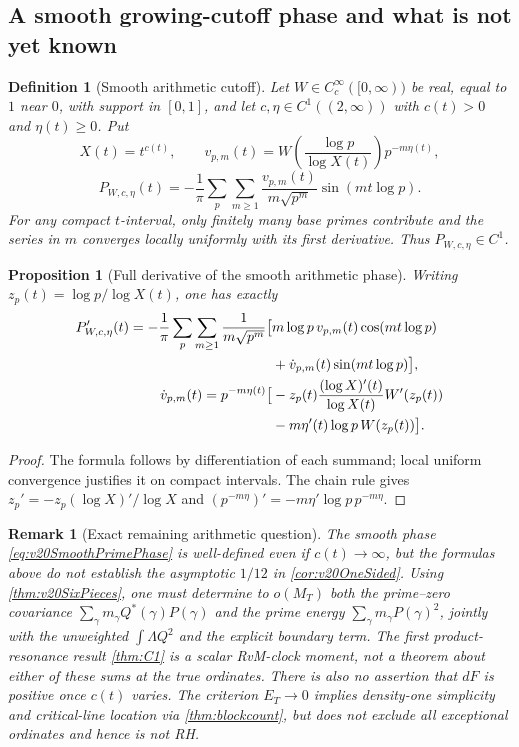 \documentclass[11pt,reqno]{amsart}
\numberwithin{equation}{section}
\newtheorem{proposition}[theorem]{Proposition}
\newtheorem{definition}[theorem]{Definition}
\newtheorem{remark}[theorem]{Remark}
\begin{document}
\subsection{A smooth growing-cutoff phase and what is not yet known}
\label{subsec:v20GrowingCutoff}
\begin{definition}[Smooth arithmetic cutoff]
Let $W\in C_c^\infty([0,\infty))$ be real, equal to $1$ near
$0$, with support in $[0,1]$, and let $c,\eta\in C^1((2,\infty))$
with $c(t)>0$ and $\eta(t)\ge0$.  Put
\[X(t)=t^{c(t)},\qquad
v_{p,m}(t)=W\left(\frac{\log p}{\log X(t)}\right)
                  p^{-m\eta(t)},\]
\begin{equation}\label{eq:v20SmoothPrimePhase}
P_{W,c,\eta}(t)=-\frac1\pi\sum_{p}\sum_{m\ge1}
\frac{v_{p,m}(t)}{m\sqrt{p^m}}\sin(mt\log p).
\end{equation}
For any compact $t$-interval, only finitely many base primes
contribute and the series in $m$ converges locally uniformly with
its first derivative.  Thus $P_{W,c,\eta}\in C^1$.
\end{definition}
\begin{proposition}[Full derivative of the smooth arithmetic phase]
\label{prop:v20SmoothDerivative}
Writing $z_p(t)=\log p/\log X(t)$, one has exactly
\begin{align}\label{eq:v20SmoothDerivative}
P_{W,c,\eta}'(t)=-\frac1\pi\sum_p\sum_{m\ge1}
\frac1{m\sqrt{p^m}}\bigl[&m\log p\,v_{p,m}(t)\cos(mt\log p)\notag\\
&+\dot v_{p,m}(t)\sin(mt\log p)\bigr],\\
\dot v_{p,m}(t)=p^{-m\eta(t)}\bigl[
&-z_p(t)\frac{(\log X)'(t)}{\log X(t)}W'(z_p(t))\notag\\
&-m\eta'(t)\log p\,W(z_p(t))\bigr].\notag
\end{align}
\end{proposition}
\begin{proof}
The formula follows by differentiation of each summand;
local uniform convergence justifies it on compact intervals.
The chain rule gives
$z_p'=-z_p(\log X)'/\log X$ and
$(p^{-m\eta})'=-m\eta'\log p\,p^{-m\eta}$.
\end{proof}

\begin{remark}[Exact remaining arithmetic question]
\label{rem:v20StillOpen}
The smooth phase \eqref{eq:v20SmoothPrimePhase} is well-defined
even if $c(t)\to\infty$, but the formulas above do \emph{not}
establish the asymptotic $1/12$ in \cref{cor:v20OneSided}.
Using \cref{thm:v20SixPieces}, one must determine to
$o(M_T)$ both the prime--zero covariance
$\sum_{\gamma}m_\gamma Q^*(\gamma)P(\gamma)$ and the
prime energy $\sum_{\gamma}m_\gamma P(\gamma)^2$, jointly
with the unweighted $\int\Lambda Q^2$ and the explicit
boundary term.  The first product-resonance result
\cref{thm:C1} is a scalar RvM-clock moment, not a theorem
about either of these sums at the true ordinates.  There is
also no assertion that $dF$ is positive once $c(t)$ varies.
The criterion $E_T\to0$ implies density-one simplicity and
critical-line location via \cref{thm:blockcount}, but does not
exclude all exceptional ordinates and hence is not RH.
\end{remark}
\end{document}
